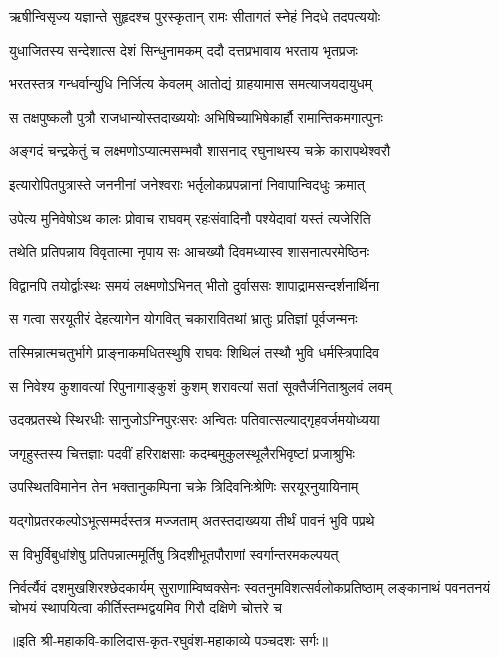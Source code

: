 \twolineshloka
{ऋषीन्विसृज्य यज्ञान्ते सुहृदश्च पुरस्कृतान्}
{रामः सीतागतं स्नेहं निदधे तदपत्ययोः} %

\twolineshloka
{युधाजितस्य सन्देशात्स देशं सिन्धुनामकम्}
{ददौ दत्तप्रभावाय भरताय भृतप्रजः} %

\twolineshloka
{भरतस्तत्र गन्धर्वान्युधि निर्जित्य केवलम्}
{आतोद्यं ग्राहयामास समत्याजयदायुधम्} %

\twolineshloka
{स तक्षपुष्कलौ पुत्रौ राजधान्योस्तदाख्ययोः}
{अभिषिच्याभिषेकार्हौ रामान्तिकमगात्पुनः} %

\twolineshloka
{अङ्गदं चन्द्रकेतुं च लक्ष्मणोऽप्यात्मसम्भवौ}
{शासनाद् रघुनाथस्य चक्रे कारापथेश्वरौ} %

\twolineshloka
{इत्यारोपितपुत्रास्ते जननीनां जनेश्वराः}
{भर्तृलोकप्रपन्नानां निवापान्विदधुः क्रमात्} %

\twolineshloka
{उपेत्य मुनिवेषोऽथ कालः प्रोवाच राघवम्}
{रहःसंवादिनौ पश्येदावां यस्तं त्यजेरिति} %

\twolineshloka
{तथेति प्रतिपन्नाय विवृतात्मा नृपाय सः}
{आचख्यौ दिवमध्यास्व शासनात्परमेष्ठिनः} %

\twolineshloka
{विद्वानपि तयोर्द्वाःस्थः समयं लक्ष्मणोऽभिनत्}
{भीतो दुर्वाससः शापाद्रामसन्दर्शनार्थिना} %

\twolineshloka
{स गत्वा सरयूतीरं देहत्यागेन योगवित्}
{चकारावितथां भ्रातुः प्रतिज्ञां पूर्वजन्मनः} %

\twolineshloka
{तस्मिन्नात्मचतुर्भागे प्राङ्नाकमधितस्थुषि}
{राघवः शिथिलं तस्थौ भुवि धर्मस्त्रिपादिव} %

\twolineshloka
{स निवेश्य कुशावत्यां रिपुनागाङ्कुशं कुशम्}
{शरावत्यां सतां सूक्तैर्जनिताश्रुलवं लवम्} %

\twolineshloka
{उदक्प्रतस्थे स्थिरधीः सानुजोऽग्निपुरःसरः}
{अन्वितः पतिवात्सल्याद्गृहवर्जमयोध्यया} %

\twolineshloka
{जगृहुस्तस्य चित्तज्ञाः पदवीं हरिराक्षसाः}
{कदम्बमुकुलस्थूलैरभिवृष्टां प्रजाश्रुभिः} %

\twolineshloka
{उपस्थितविमानेन तेन भक्तानुकम्पिना}
{चक्रे त्रिदिवनिःश्रेणिः सरयूरनुयायिनाम्} %

\twolineshloka
{यद्गोप्रतरकल्पोऽभूत्सम्मर्दस्तत्र मज्जताम्}
{अतस्तदाख्यया तीर्थं पावनं भुवि पप्रथे} %

\twolineshloka
{स विभुर्विबुधांशेषु प्रतिपन्नात्ममूर्तिषु}
{त्रिदशीभूतपौराणां स्वर्गान्तरमकल्पयत्} %

\fourlineindentedshloka
{निर्वर्त्यैवं दशमुखशिरश्छेदकार्यम्}
{सुराणाम्विष्वक्सेनः स्वतनुमविशत्सर्वलोकप्रतिष्ठाम्}
{लङ्कानाथं पवनतनयं चोभयं स्थापयित्वा}
{कीर्तिस्तम्भद्वयमिव गिरौ दक्षिणे चोत्तरे च} %

॥इति श्री-महाकवि-कालिदास-कृत-रघुवंश-महाकाव्ये पञ्चदशः सर्गः॥